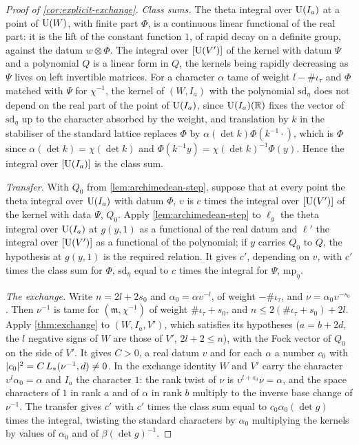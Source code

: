 \begin{proof}[Proof of \cref{cor:explicit-exchange}]
\emph{Class sums.} The theta integral over $\operatorname{U}(I_a)$ at a point of $\operatorname{U}(W)$, with finite part $\Phi$, is a continuous linear functional of the real part: it is the lift of the constant function $1$, of rapid decay on a
definite group, against the datum $w\otimes\Phi$. The integral over $[\operatorname{U}(V')]$ of the kernel with datum $\Psi$ and a polynomial $Q$ is a linear form in $Q$, the kernels being rapidly decreasing as $\Psi$ lives on left
invertible matrices. For a character $\alpha$ tame of weight $l-\#\iota_\tau$ and $\Phi$ matched with $\Psi$ for $\chi^{-1}$, the kernel of $(W,I_a)$ with the polynomial $\mathrm{sd}_\eta$ does not depend on the real part of
the point of $\operatorname{U}(I_a)$, since $\operatorname{U}(I_a)(\mathbb{R})$ fixes the vector of $\mathrm{sd}_\eta$ up to the character absorbed by the weight, and translation by $k$ in the stabiliser of the standard lattice replaces $\Phi$ by
$\alpha(\det k)\Phi(k^{-1}\cdot)$, which is $\Phi$ since $\alpha(\det k)=\chi(\det k)$ and $\Phi(k^{-1}y)=\chi(\det k)^{-1}\Phi(y)$. Hence the integral over $[\operatorname{U}(I_a)]$ is the class sum.

\emph{Transfer.} With $Q_0$ from \cref{lem:archimedean-step}, suppose that at every point the theta integral over $\operatorname{U}(I_a)$ with datum $\Phi$, $v$ is $c$ times the integral over $[\operatorname{U}(V')]$ of the kernel with data $\Psi$,
$Q_0$. Apply \cref{lem:archimedean-step} to $\ell_g$ the theta integral over $\operatorname{U}(I_a)$ at $g(y,1)$ as a functional of the real datum and $\ell'$ the integral over $[\operatorname{U}(V')]$ as a functional of the polynomial; if $y$ carries
$Q_0$ to $Q$, the hypothesis at $g(y,1)$ is the required relation. It gives $c'$, depending on $v$, with $c'$ times the class sum for $\Phi$, $\mathrm{sd}_\eta$ equal to $c$ times the integral for $\Psi$, $\mathrm{mp}_\eta$.

\emph{The exchange.} Write $n=2l+2s_0$ and $\alpha_0=\alpha\upsilon^{-l}$, of weight $-\#\iota_\tau$, and $\nu=\alpha_0\upsilon^{-s_0}$. Then $\nu^{-1}$ is tame for $(\mathfrak m,\chi^{-1})$ of weight $\#\iota_\tau+s_0$, and
$n\le2(\#\iota_\tau+s_0)+2l$. Apply \cref{thm:exchange} to $(W,I_a,V')$, which satisfies its hypotheses ($a=b+2d$, the $l$ negative signs of $W$ are those of $V'$, $2l+2\le n$), with the Fock vector of $Q_0$ on the side of $V'$. It
gives $C>0$, a real datum $v$ and for each $\alpha$ a number $c_0$ with $\lvert c_0\rvert^2=C\,L_*(\nu^{-1},d)\ne0$. In the exchange identity $W$ and $V'$ carry the character $\upsilon^l\alpha_0=\alpha$ and $I_a$ the character $1$: the
rank twist of $\nu$ is $\upsilon^{l+s_0}\nu=\alpha$, and the space characters of $1$ in rank $a$ and of $\alpha$ in rank $b$ multiply to the inverse base change of $\nu^{-1}$. The transfer gives $c'$ with $c'$ times the class sum
equal to $c_0\alpha_0(\det g)$ times the integral, twisting the standard characters by $\alpha_0$ multiplying the kernels by values of $\alpha_0$ and of $\beta(\det g)^{-1}$.


\end{proof}
